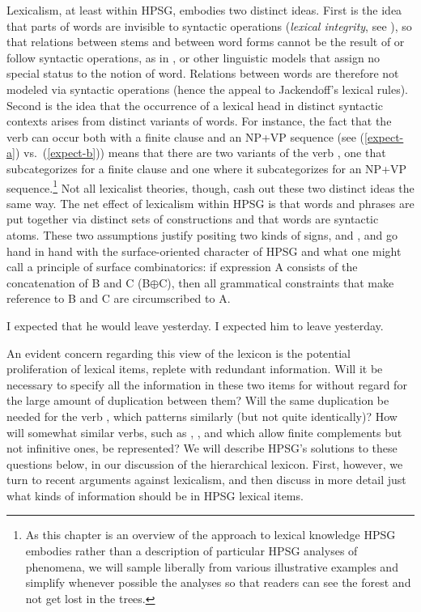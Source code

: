 \documentclass[output=paper
 	        ,biblatex
                ,babelshorthands
                ,newtxmath
                ,draftmode
                ,colorlinks, citecolor=brown
]{langscibook}
\begin{document}
Lexicalism, at least within HPSG, embodies two distinct ideas. First is the idea that parts of words
are invisible to syntactic operations (\emph{lexical integrity}, see
\citealt{BresnanandMchombo1995}), so that relations between stems and between word forms cannot be
the result of or follow syntactic operations, as in 
\citep{HalleandMarantz1993}, or other linguistic models that assign no special status to the notion
of word. Relations between words are therefore not modeled via syntactic operations (hence the
appeal to Jackendoff's lexical rules). Second is the idea that the occurrence of a lexical head in distinct syntactic contexts arises from distinct variants of words. For instance, the fact that the verb  can occur both with a finite clause and an NP+VP sequence (see (\ref{expect-a}) vs.\ (\ref{expect-b})) means that there are two variants of the verb , one that subcategorizes for a finite clause and one where it subcategorizes for an NP+VP sequence.\footnote{As this chapter is an overview of the approach to lexical knowledge HPSG embodies rather than a description of particular HPSG analyses of phenomena, we will sample liberally from various illustrative examples and simplify whenever possible the analyses so that readers can see the forest and not get lost in the trees.} Not all lexicalist theories, though, cash out these two distinct ideas the same way. The net effect of lexicalism within HPSG is that words and phrases are put together via distinct sets of constructions and that words are syntactic atoms. These two assumptions justify positing two kinds of signs,  and , and go hand in hand with the surface-oriented character of HPSG and what one might call a principle of surface combinatorics: if expression A consists of the concatenation of B and C (B$\oplus$C), then all grammatical constraints that make reference to B and C are circumscribed to A. 

\begin{exe}
	\ex \label{expect-b} I expected that he would leave yesterday.
	\ex \label{expect-a} I expected him to leave yesterday.
\end{exe}

An evident concern regarding this view of the lexicon is the potential proliferation of lexical items, replete with redundant information. Will it be necessary to specify all the information in these two items for  without regard for the large amount of duplication between them? Will the same duplication be needed for the verb  , which patterns similarly (but not quite identically)? How will somewhat similar verbs, such as , , and  which allow finite complements but not infinitive ones, be represented? We will describe HPSG's solutions to these questions below, in our discussion of the hierarchical lexicon. First, however, we turn to recent arguments against lexicalism, and then discuss in more detail just what kinds of information should be in HPSG lexical items.
\end{document}
